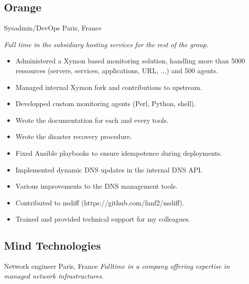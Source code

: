 \documentclass[]{friggeri-cv} %
\begin{document}
\subsection{Orange}
\begin{entrylist}
 {Sysadmin/DevOps} {Paris, France} {
  \emph{Full time in the subsidiary hosting services for the rest of the group.}
  \begin{itemize}
    \item Administered a Xymon based monitoring solution, handling more than 5000 ressources (servers, services, applications, URL, ...) and 500 agents.
    \item Managed internal Xymon fork and contributions to upstream.
    \item Developped custom monitoring agents (Perl, Python, shell).
    \item Wrote the documentation for each and every tools.
    \item Wrote the disaster recovery procedure.
    \item Fixed Ansible playbooks to ensure idempotence during deployments.
    \item Implemented dynamic DNS updates in the internal DNS API.
    \item Various improvements to the DNS management tools.
    \item Contributed to nsdiff (https://github.com/fanf2/nsdiff).
    \item Trained and provided technical support for my colleagues.
  \end{itemize}
}
\end{entrylist}


\subsection{Mind Technologies}
\begin{entrylist}
 {Network engineer} {Paris, France} {
  \emph{Fulltime in a company offering expertise in managed network infrastructures.}
}
\end{entrylist}


\pagebreak
\end{document}
